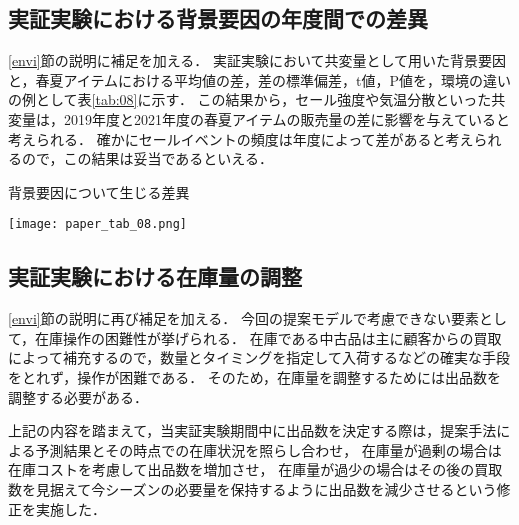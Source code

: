 \documentclass[dvipdfmx]{jreport}
\begin{document}
\newpage
\subsection{実証実験における背景要因の年度間での差異}
\ref{envi}節の説明に補足を加える．
実証実験において共変量として用いた背景要因と，春夏アイテムにおける平均値の差，差の標準偏差，t値，P値を，環境の違いの例として表\ref{tab:08}に示す．
この結果から，セール強度や気温分散といった共変量は，2019年度と2021年度の春夏アイテムの販売量の差に影響を与えていると考えられる．
確かにセールイベントの頻度は年度によって差があると考えられるので，この結果は妥当であるといえる．
\begin{table}[h]
    \begin{center}
        \caption{背景要因について生じる差異} \label{tab:08}
        \texttt{[image: paper\_tab\_08.png]}
    \end{center}
\end{table}

\subsection{実証実験における在庫量の調整}
\ref{envi}節の説明に再び補足を加える．
今回の提案モデルで考慮できない要素として，在庫操作の困難性が挙げられる．
在庫である中古品は主に顧客からの買取によって補充するので，数量とタイミングを指定して入荷するなどの確実な手段をとれず，操作が困難である．
そのため，在庫量を調整するためには出品数を調整する必要がある．

上記の内容を踏まえて，当実証実験期間中に出品数を決定する際は，提案手法による予測結果とその時点での在庫状況を照らし合わせ，
在庫量が過剰の場合は在庫コストを考慮して出品数を増加させ，
在庫量が過少の場合はその後の買取数を見据えて今シーズンの必要量を保持するように出品数を減少させるという修正を実施した．
\end{document}
